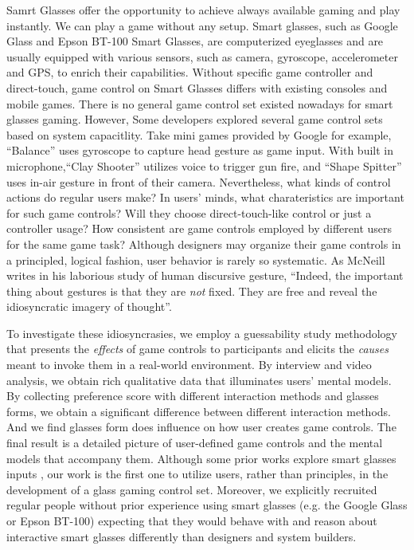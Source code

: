 \documentclass{sigchi}
\begin{document}
Samrt Glasses offer the opportunity to achieve always available gaming and play instantly. We can play a game without any setup. Smart glasses, such as Google Glass and Epson BT-100 Smart Glasses, are computerized eyeglasses and are usually equipped with various sensors, such as camera, gyroscope, accelerometer and GPS, to enrich their capabilities. 
Without specific game controller and direct-touch, game control on Smart Glasses differs with existing consoles and mobile games. There is no general game control set existed nowadays for smart glasses gaming. However, Some developers explored several game control sets based on system capacitlity. Take mini games \cite{MiniGames} provided by Google for example, ``Balance'' uses gyroscope to capture head gesture as game input. With built in microphone,``Clay Shooter'' utilizes voice to trigger gun fire, and ``Shape Spitter'' uses in-air gesture in front of their camera.  
Nevertheless, what kinds of control actions do regular users make? In users' minds, what charateristics are important for such game controls? Will they choose direct-touch-like control or just a controller usage? How consistent are game controls employed by different users for the same game task? 
Although designers may organize their game controls in a principled, logical fashion, user behavior is rarely so systematic. As McNeill \cite{HandAndMind} writes in his laborious study of human discursive gesture, ``Indeed, the important thing about gestures is that they are \emph{not} fixed. They are free and reveal the idiosyncratic imagery of thought''.

To investigate these idiosyncrasies, we employ a guessability study methodology \cite{Wobbrock:2005:MGS:1056808.1057043} that presents the \emph{effects} of game controls to participants and elicits the \emph{causes} meant to invoke them in a real-world environment. By interview and video analysis, we obtain rich qualitative data that illuminates users' mental models. By collecting preference score with different interaction methods and glasses forms, we obtain a significant difference between different interaction methods. And we find glasses form does influence on how user creates game controls. The final result is a detailed picture of user-defined game controls and the mental models that accompany them. Although some prior works explore smart glasses inputs \cite{Colaco:2013:MCL:2501988.2502042,Serrano:2014:EUH:2611247.2556984}, our work is the first one to utilize users, rather than principles, in the development of a glass gaming control set. Moreover, we explicitly recruited regular people without prior experience using smart glasses (e.g. the Google Glass or Epson BT-100) expecting that they would behave with and reason about interactive smart glasses differently than designers and system builders.
\end{document}
